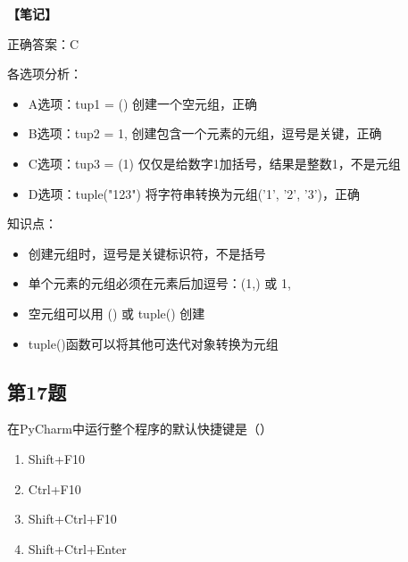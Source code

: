 \begin{mdframed}[linewidth=1pt, linecolor=black]

  \textbf{\color{red}【笔记】}

  正确答案：C

  各选项分析：
  \begin{itemize}
    \item A选项：tup1 = () 创建一个空元组，正确
    \item B选项：tup2 = 1, 创建包含一个元素的元组，逗号是关键，正确
    \item C选项：tup3 = (1) 仅仅是给数字1加括号，结果是整数1，不是元组
    \item D选项：tuple("123") 将字符串转换为元组('1', '2', '3')，正确
  \end{itemize}

  知识点：
  \begin{itemize}
    \item 创建元组时，逗号是关键标识符，不是括号
    \item 单个元素的元组必须在元素后加逗号：(1,) 或 1,
    \item 空元组可以用 () 或 tuple() 创建
    \item tuple()函数可以将其他可迭代对象转换为元组
  \end{itemize}

\end{mdframed}

\subsection{第17题}
在PyCharm中运行整个程序的默认快捷键是（）

\begin{enumerate}[label=\Alph*.]
  \item Shift+F10
  \item Ctrl+F10
  \item Shift+Ctrl+F10
  \item Shift+Ctrl+Enter
\end{enumerate}

